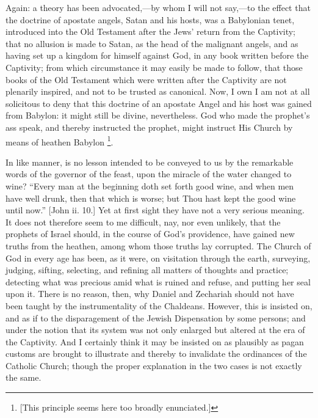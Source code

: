Again: a theory has been advocated,—by whom I will not say,—to
the effect that the doctrine of apostate angels, Satan and his hosts,
was a Babylonian tenet, introduced into the Old Testament after the
Jews' return from the Captivity; that no allusion is made to Satan, as
the head of the malignant angels, and as having set up a kingdom for
himself against God, in any book written before the Captivity; from
which circumstance it may easily be made to follow, that those books
of the Old Testament which were written after the Captivity are not
plenarily inspired, and not to be trusted as canonical. Now, I own I
am not at all solicitous to deny that this doctrine of an apostate
Angel and his host was gained from Babylon: it might still be divine,
nevertheless. God who made the prophet's ass speak, and thereby instructed the prophet, might instruct His Church by means of
heathen Babylon \footnote{[This principle
seems here too broadly enunciated.]}.

In like manner, is no lesson intended to be conveyed to us by the
remarkable words of the governor of the feast, upon the miracle of the
water changed to wine? ``Every man at the beginning doth set forth
good wine, and when men have well drunk, then that which is worse; but
Thou hast kept the good wine until now.'' [John ii. 10.] Yet at
first sight they have not a very serious meaning. It does not
therefore seem to me difficult, nay, nor even unlikely, that the
prophets of Israel should, in the course of God's providence, have
gained new truths from the heathen, among whom those truths lay
corrupted. The Church of God in every age has been, as it were, on
visitation through the earth, surveying, judging, sifting, selecting,
and refining all matters of thoughts and practice; detecting what was
precious amid what is ruined and refuse, and putting her seal upon it.
There is no reason, then, why Daniel and Zechariah should not have
been taught by the instrumentality of the Chaldeans. However, this is
insisted on, and as if to the disparagement of the Jewish Dispensation
by some persons; and under the notion that its system was not only
enlarged but altered at the era of the Captivity. And I certainly
think it may be insisted on as plausibly as pagan customs are brought
to illustrate and thereby to invalidate the ordinances of the Catholic
Church; though the proper explanation in the two cases is not exactly
the same.

